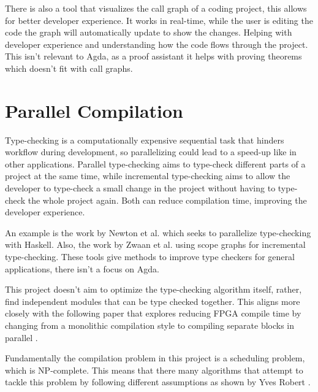 There is also a tool \cite{call_graph_vis} that visualizes the call graph of a
coding project, this allows for better developer experience. It works in
real-time, while the user is editing the code the graph will automatically
update to show the changes. Helping with developer experience and understanding
how the code flows through the project. This isn't relevant to Agda, as a proof
assistant it helps with proving theorems which doesn't fit with call graphs.

\section{Parallel Compilation}



Type-checking is a computationally expensive sequential task that hinders
workflow during development, so parallelizing could lead to a speed-up like in
other applications. Parallel type-checking aims to type-check different parts
of a project at the same time, while incremental type-checking aims to allow
the developer to type-check a small change in the project without having to
type-check the whole project again. Both can reduce compilation time, improving
the developer experience.

An example is the work by Newton et al. \cite{paralele_comp_haskell} which
seeks to parallelize type-checking with Haskell. Also, the work by Zwaan et al.
\cite{incremental_type_checking} using scope graphs for incremental
type-checking. These tools give methods to improve type checkers for general
applications, there isn't a focus on Agda.

This project doesn't aim to optimize the type-checking algorithm
itself, rather, find independent modules that can be type checked together.
This aligns more closely with the following paper that explores reducing FPGA
compile time by changing from a monolithic compilation style to compiling
separate blocks in parallel \cite{FPGA}.


Fundamentally the compilation problem in this project is a scheduling problem,
which is NP-complete\cite{scheduling}. This means that there many algorithms
that attempt to tackle this problem by following different assumptions as shown
by Yves Robert \cite{scheduling}.

